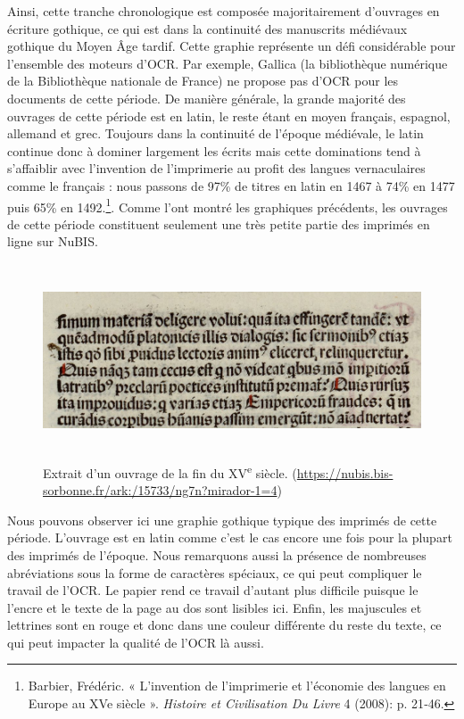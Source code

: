 \documentclass[a4paper,12pt,twoside]{book}
\begin{document}
Ainsi, cette tranche chronologique est composée majoritairement
d'ouvrages en écriture gothique, ce qui est dans la continuité des manuscrits médiévaux gothique du Moyen Âge tardif. Cette graphie représente un
défi considérable pour l'ensemble des moteurs d'OCR. Par exemple,
Gallica (la bibliothèque numérique de la Bibliothèque nationale de France)
ne propose pas d'OCR pour les documents de cette période. De manière
générale, la grande majorité des ouvrages de cette période est en latin,
le reste étant en moyen français, espagnol, allemand et grec. Toujours dans la continuité de l'époque médiévale, le latin continue donc à dominer largement les écrits mais cette dominations tend à s'affaiblir avec l'invention de l'imprimerie au profit des langues vernaculaires comme le français : nous passons de 97\% de titres en latin en 1467 à 74\% en 1477 puis 65\% en 1492.\footnote{Barbier, Frédéric. « L’invention de l’imprimerie et l’économie des langues en Europe au XVe siècle ». \emph{Histoire et Civilisation Du Livre} 4 (2008): p. 21‑46.}. Comme l'ont montré les graphiques précédents, les ouvrages de cette période constituent seulement une
très petite partie des imprimés en ligne sur NuBIS. \\

\begin{figure} [H]
	\includegraphics[width=6.26806in,height=2.26389in]{vertopal_157ae480aa4a4b07be198b586a812241/media/image6.png}
	
	\caption{Extrait d'un ouvrage de la fin du
		XV\textsuperscript{e} siècle.
		(\url{https://nubis.bis-sorbonne.fr/ark:/15733/ng7n?mirador-1=4})}
\end{figure}

Nous pouvons observer ici une graphie gothique typique des imprimés de cette période. L'ouvrage est en latin comme c'est le cas encore une fois pour la plupart des imprimés de l'époque. Nous remarquons aussi la présence de nombreuses abréviations sous la forme de caractères spéciaux, ce qui peut compliquer le travail de l'OCR. Le papier rend ce travail d'autant plus difficile puisque le l'encre et le texte de la page au dos sont lisibles ici. Enfin, les majuscules et lettrines sont en rouge et donc dans une couleur différente du reste du texte, ce qui peut impacter la qualité de l'OCR là aussi. 
\end{document}
